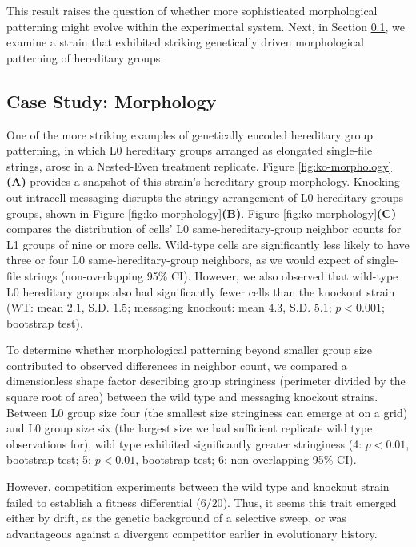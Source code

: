 This result raises the question of whether more sophisticated morphological patterning might evolve within the experimental system.
Next, in Section \ref{sec:morphology}, we examine a strain that exhibited striking genetically driven morphological patterning of hereditary groups.

\subsection{Case Study: Morphology} \label{sec:morphology}



One of the more striking examples of genetically encoded hereditary group patterning, in which L0 hereditary groups arranged as elongated single-file strings, arose in a Nested-Even treatment replicate.
Figure \ref{fig:ko-morphology}\textbf{(A)} provides a snapshot of this strain's hereditary group morphology.
Knocking out intracell messaging disrupts the stringy arrangement of L0 hereditary groups groups, shown in Figure \ref{fig:ko-morphology}\textbf{(B)}.
Figure \ref{fig:ko-morphology}\textbf{(C)} compares the distribution of cells' L0 same-hereditary-group neighbor counts for L1 groups of nine or more cells.
Wild-type cells are significantly less likely to have three or four L0 same-hereditary-group neighbors, as we would expect of single-file strings (non-overlapping 95\% CI).
However, we also observed that wild-type L0 hereditary groups also had significantly fewer cells than the knockout strain
(WT: mean $2.1$, S.D. $1.5$; messaging knockout: mean $4.3$, S.D. 5.1; $p < 0.001$; bootstrap test).

To determine whether morphological patterning beyond smaller group size contributed to observed differences in neighbor count, we compared a dimensionless shape factor describing group stringiness (perimeter divided by the square root of area) between the wild type and messaging knockout strains.
Between L0 group size four (the smallest size stringiness can emerge at on a grid) and L0 group size six (the largest size we had sufficient replicate wild type observations for), wild type exhibited significantly greater stringiness
(4: $p < 0.01$, bootstrap test; 5: $p < 0.01$, bootstrap test; 6: non-overlapping 95\% CI).

However, competition experiments between the wild type and knockout strain failed to establish a fitness differential ($6/20$).
Thus, it seems this trait emerged either by drift, as the genetic background of a selective sweep, or was advantageous against a divergent competitor earlier in evolutionary history.



